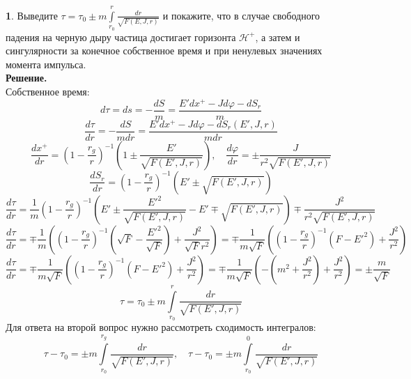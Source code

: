 \documentclass[12pt]{article}
\theoremstyle{definition}
\newtheorem{zad}{}[section]
\begin{document}
\begin{zad}
Выведите $\tau=\tau_0\pm m\int\limits_{r_0}^r\frac{dr}{\sqrt{F(E,J,r)}}$ и покажите, что в случае свободного падения на черную дыру частица достигает горизонта $\mathcal{H}^+$, а затем и сингулярности за конечное собственное время и при ненулевых значениях момента импульса.\\
\textbf{Решение.}\\
Собственное время:
\begin{equation}
    d\tau=ds=-\frac{dS}{m}=\frac{E'dx^+-Jd\varphi-dS_r}{m}
\end{equation}
\begin{equation}
    \frac{d\tau}{dr}=-\frac{dS}{mdr}=\frac{E'dx^+-Jd\varphi-dS_r(E',J,r)}{mdr}
\end{equation}
\begin{equation}
    \frac{dx^+}{dr}=\left(1-\frac{r_g}{r}\right)^{-1}\left(1\pm\frac{E'}{\sqrt{F(E',J,r)}}\right),\quad\frac{d\varphi}{dr}=\pm\frac{J}{r^2\sqrt{F(E',J,r)}}
\end{equation}
\begin{equation}
    \frac{dS_r}{dr}=\left(1-\frac{r_g}{r}\right)^{-1}\left(E'\pm\sqrt{F(E',J,r)}\right)
\end{equation}
\begin{equation}
    \frac{d\tau}{dr}=\frac{1}{m}\left(1-\frac{r_g}{r}\right)^{-1}\left(E'\pm\frac{E'^2}{\sqrt{F(E',J,r)}}-E'\mp\sqrt{F(E',J,r)}\right)\mp\frac{J^2}{r^2\sqrt{F(E',J,r)}}
\end{equation}
\begin{equation*}
    \frac{d\tau}{dr}=\mp\frac{1}{m}\left(\left(1-\frac{r_g}{r}\right)^{-1}\left(\sqrt{F}-\frac{E'^2}{\sqrt{F}}\right)+\frac{J^2}{\sqrt{F}r^2}\right)=\mp\frac{1}{m\sqrt{F}}\left(\left(1-\frac{r_g}{r}\right)^{-1}\left(F-E'^2\right)+\frac{J^2}{r^2}\right)
\end{equation*}
\begin{equation}
    \frac{d\tau}{dr}=\mp\frac{1}{m\sqrt{F}}\left(\left(1-\frac{r_g}{r}\right)^{-1}\left(F-E'^2\right)+\frac{J^2}{r^2}\right)=\mp\frac{1}{m\sqrt{F}}\left(-\left(m^2+\frac{J^2}{r^2}\right)+\frac{J^2}{r^2}\right)=\pm\frac{m}{\sqrt{F}}
\end{equation}
\begin{equation}
    \boxed{\tau=\tau_0\pm m\int\limits_{r_0}^r\frac{dr}{\sqrt{F(E',J,r)}}}
\end{equation}
Для ответа на второй вопрос нужно рассмотреть сходимость интегралов:
\begin{equation}
    \tau-\tau_0=\pm m\int\limits_{r_0}^{r_g}\frac{dr}{\sqrt{F(E',J,r)}},\quad \tau-\tau_0=\pm m\int\limits_{r_0}^0\frac{dr}{\sqrt{F(E',J,r)}}

\end{equation}
\end{zad}
\end{document}
